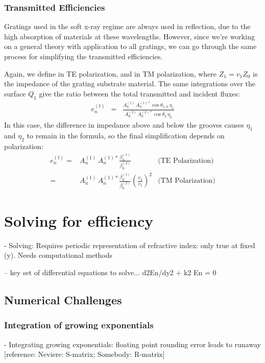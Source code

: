 \subsubsection{Transmitted Efficiencies}
Gratings used in the soft x-ray regime are always used in reflection, due to the high absorption of materials at these wavelengths.  However, since we're working on a general theory with application to all gratings, we can go through the same process for simplifying the transmitted efficiencies.  

Again, we define  in TE polarization, and  in TM polarization, where $Z_1 = v_1 Z_0$ is the impedance of the grating substrate material.  The same integrations over the surface $Q_1$ give the ratio between the total transmitted and incident fluxes:
\begin{eqnarray}
e_n^{(t)} &=& \frac{    A_n^{(1)} \, A_n^{(1)\ast} \cos \theta_{1,n} \, \eta_1       }{    A_0^{(2)} \, A_0^{(2)\ast}  \cos \theta_{2} \,  \eta_2   }
\end{eqnarray}
In this case, the difference in impedance above and below the grooves causes $\eta_1$ and $\eta_2$ to remain in the formula, so the final simplification depends on polarization:
\begin{eqnarray}
e_n^{(t)} =& A_n^{(1)} \, A_n^{(1)\ast} \frac{  \beta_n^{(1)}   } {  \beta_0^{(2)} }  & \textrm{(TE Polarization)} \\
=& A_n^{(1)} \, A_n^{(1)\ast} \frac{  \beta_n^{(1)}   } {  \beta_0^{(2)} }  \left( \frac{v_2}{v_1} \right)^2 & \textrm{(TM Polarization)}
\end{eqnarray}


                         
\section{Solving for efficiency}


          - Solving: Requires periodic representation of refractive index: only true at fixed (y).  Needs computational methods
          
          -- key set of differential equations to solve... d2En/dy2 + k2 En = 0
\subsection{Numerical Challenges}
\subsubsection{Integration of growing exponentials}
               - Integrating growing exponentials: floating point rounding error leads to runaway [reference: Neviere: S-matrix; Somebody: R-matrix]

